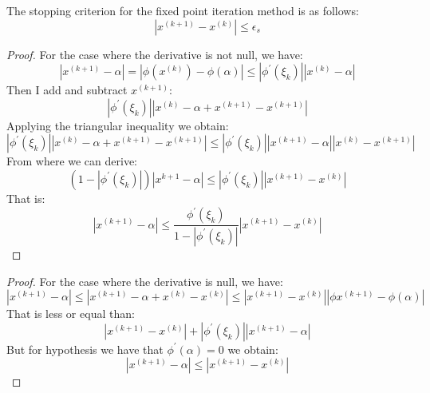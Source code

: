 The stopping criterion for the fixed point iteration method is as follows:
\[\left\lvert x^{(k+1)}-x^{(k)} \right\rvert \leq \epsilon_s\]
\begin{proof}
    For the case where the derivative is not null, we have: 
    \[\left\lvert x^{(k+1)} - \alpha \right\rvert = \left\lvert \phi(x^{(k)}) - \phi(\alpha) \right\rvert \leq \left\lvert \phi^{'}(\xi_k)\right\rvert \left\lvert x^{(k)} - \alpha\right\rvert \]
    Then I add and subtract $x^{(k+1)}$: 
    \[\left\lvert \phi^{'}(\xi_k)\right\rvert \left\lvert x^{(k)}-\alpha + x^{(k+1)} - x^{(k+1)}\right\rvert\]
    Applying the triangular inequality we obtain: 
    \[\left\lvert \phi^{'}(\xi_k)\right\rvert\left\lvert x^{(k)}-\alpha+x^{(k+1)}-x^{(k+1)}\right\rvert\leq\left\lvert\phi^{'}(\xi_k)\right\rvert\left\lvert x^{(k+1)}-\alpha \right\rvert\left\lvert x^{(k)}-x^{(k+1)}\right\rvert\]
    From where we can derive: 
    \[\left(1-\left\lvert\phi^{'}(\xi_k)\right\rvert\right)\left\lvert x^{k+1}-\alpha\right\rvert\leq\left\lvert\phi^{'}(\xi_k)\right\rvert\left\lvert x^{(k+1)}-x^{(k)}\right\rvert\]
    That is: 
    \[\left\lvert x^{(k+1)}-\alpha\right\rvert\leq\dfrac{\phi^{'}(\xi_k)}{1-\left\lvert\phi^{'}(\xi_k)\right\rvert}\left\lvert x^{(k+1)}-x^{(k)}\right\rvert\]
\end{proof}
\begin{proof}
    For the case where the derivative is null, we have: 
    \[\left\lvert x^{(k+1)}-\alpha\right\rvert\leq\left\lvert x^{(k+1)}-\alpha+x^{(k)}-x^{(k)}\right\rvert\leq\left\lvert x^{(k+1)}-x^{(k)}\right\rvert\left\lvert\phi{x^{(k+1)}}-\phi(\alpha)\right\rvert\]
    That is less or equal than:
    \[\left\lvert x^{(k+1)}-x^{(k)}\right\rvert+\left\lvert\phi^{'}(\xi_k)\right\rvert\left\lvert x^{(k+1)}-\alpha\right\rvert\]
    But for hypothesis we have that $\phi^{'}(\alpha)=0$ we obtain: 
    \[\left\lvert x^{(k+1)}-\alpha\right\rvert\leq\left\lvert x^{(k+1)}-x^{(k)}\right\rvert\]
\end{proof}